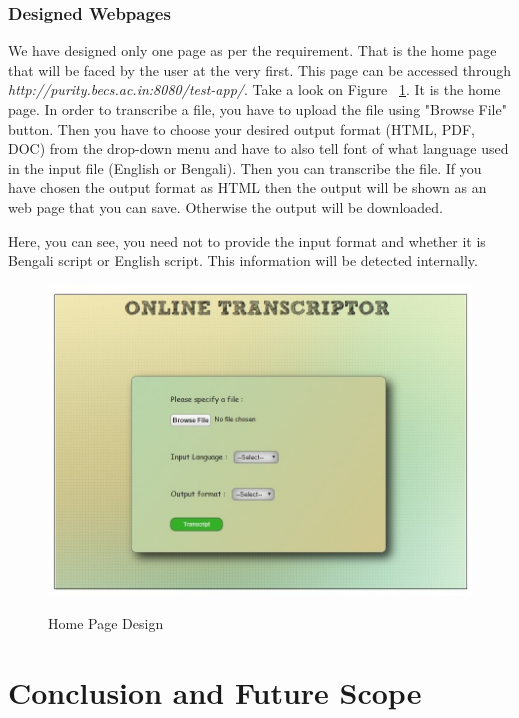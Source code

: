 \documentclass[12pt,oneside,openany,a4paper]{book}
\begin{document}
\subsection{Designed Webpages}
We have designed only one page as per the requirement. That is the home page that will be faced by the user at the very first. This page can be accessed through \emph{http://purity.becs.ac.in:8080/test-app/}. Take a look on Figure ~\ref{fig:homepage}. It is the home page. In order to transcribe a file, you have to upload the file using "Browse File" button. Then you have to choose your desired output format (HTML, PDF, DOC) from the drop-down menu and have to also tell font of what language used in the input file (English or Bengali). Then you can transcribe the file. If you have chosen the output format as HTML then the output will be shown as an web page that you can save. Otherwise the output will be downloaded.
\par \vspace{0.3cm}
Here, you can see, you need not to provide the input format and whether it is Bengali script or English script. This information will be detected internally. 
\par \vspace{0.3cm} 
\begin{figure}[H]
		\caption{Home Page Design}
		\centering
		\includegraphics[scale=0.6]{interface}
		\label{fig:homepage}
\end{figure}
\par





\chapter{Conclusion and Future Scope}
\label{conclusion}
\end{document}
